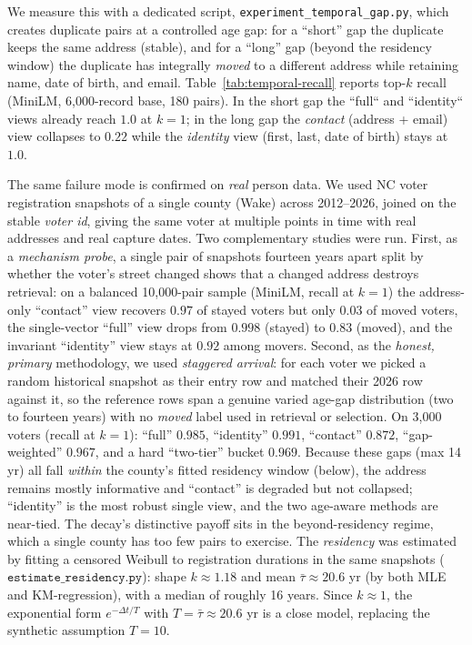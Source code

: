 \documentclass[11pt]{article}
\begin{document}
We measure this with a dedicated script, \texttt{experiment\_temporal\_gap.py}, which creates
duplicate pairs at a controlled age gap: for a ``short'' gap the duplicate keeps the same
address (stable), and for a ``long'' gap (beyond the residency window) the duplicate has
integrally \emph{moved} to a different address while retaining name, date of birth, and email.
Table~\ref{tab:temporal-recall} reports top-$k$ recall (MiniLM, 6{,}000-record base, 180
pairs). In the short gap the ``full`` and ``identity`` views already reach $1.0$ at $k{=}1$;
in the long gap the \emph{contact} (address + email) view collapses to $0.22$ while the
\emph{identity} view (first, last, date of birth) stays at $1.0$.

The same failure mode is confirmed on \emph{real} person data. We used NC voter registration
snapshots of a single county (Wake) across 2012--2026, joined on the stable \emph{voter id},
giving the same voter at multiple points in time with real addresses and real capture dates.
Two complementary studies were run. First, as a \emph{mechanism probe}, a single pair of
snapshots fourteen years apart split by whether the voter's street changed shows that a changed
address destroys retrieval: on a balanced 10{,}000-pair sample (MiniLM, recall at $k{=}1$) the
address-only ``contact'' view recovers $0.97$ of stayed voters but only $0.03$ of moved voters,
the single-vector ``full'' view drops from $0.998$ (stayed) to $0.83$ (moved), and the
invariant ``identity'' view stays at $0.92$ among movers. Second, as the \emph{honest, primary}
methodology, we used \emph{staggered arrival}: for each voter we picked a random historical
snapshot as their entry row and matched their 2026 row against it, so the reference rows span a
genuine varied age-gap distribution (two to fourteen years) with no \emph{moved} label used in
retrieval or selection. On 3{,}000 voters (recall at $k{=}1$): ``full'' $0.985$, ``identity''
$0.991$, ``contact'' $0.872$, ``gap-weighted'' $0.967$, and a hard ``two-tier'' bucket $0.969$.
Because these gaps (max 14 yr) all fall \emph{within} the county's fitted residency window
(below), the address remains mostly informative and ``contact'' is degraded but not collapsed;
``identity'' is the most robust single view, and the two age-aware methods are near-tied. The
decay's distinctive payoff sits in the beyond-residency regime, which a single county has too few
pairs to exercise. The \emph{residency} was estimated by fitting a censored Weibull to
registration durations in the same snapshots ($\texttt{estimate\_residency.py}$): shape
$k\approx1.18$ and mean $\bar\tau\approx20.6$ yr (by both MLE and KM-regression), with a median
of roughly 16 years. Since $k\approx1$, the exponential form $e^{-\Delta t/T}$ with
$T=\bar\tau\approx20.6$ yr is a close model, replacing the synthetic assumption $T{=}10$.
\end{document}
